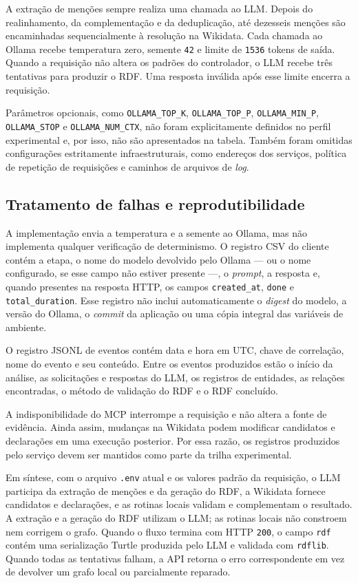 A extração de menções sempre realiza uma chamada ao LLM. Depois do
realinhamento, da complementação e da deduplicação, até dezesseis menções são
encaminhadas sequencialmente à resolução na Wikidata. Cada chamada ao Ollama
recebe temperatura zero, semente \texttt{42} e limite de \texttt{1536} tokens de
saída. Quando a requisição não altera os padrões do controlador, o LLM recebe
três tentativas para produzir o RDF. Uma resposta inválida após esse limite
encerra a requisição.

Parâmetros opcionais, como \texttt{OLLAMA\_TOP\_K},
\texttt{OLLAMA\_TOP\_P}, \texttt{OLLAMA\_MIN\_P}, \texttt{OLLAMA\_STOP} e
\texttt{OLLAMA\_NUM\_CTX}, não foram explicitamente definidos no perfil
experimental e, por isso, não são apresentados na tabela. Também foram omitidas
configurações estritamente infraestruturais, como endereços dos serviços,
política de repetição de requisições e caminhos de arquivos de \textit{log}.

\subsection{Tratamento de falhas e reprodutibilidade}
\label{subsec:hybrid-reprodutibilidade}

A implementação envia a temperatura e a semente ao Ollama, mas não implementa
qualquer verificação de determinismo. O registro CSV do cliente contém a etapa,
o nome do modelo devolvido pelo Ollama --- ou o nome configurado, se esse campo
não estiver presente ---, o \textit{prompt}, a resposta e, quando presentes na
resposta HTTP, os campos \texttt{created\_at}, \texttt{done} e
\texttt{total\_duration}. Esse registro não inclui automaticamente o
\textit{digest} do modelo, a versão do Ollama, o \textit{commit} da aplicação ou
uma cópia integral das variáveis de ambiente.

O registro JSONL de eventos contém data e hora em UTC, chave de correlação, nome
do evento e seu conteúdo. Entre os eventos produzidos estão o início da análise,
as solicitações e respostas do LLM, os registros de entidades, as relações
encontradas, o método de validação do RDF e o RDF concluído.

A indisponibilidade do MCP interrompe a requisição e não altera a fonte de
evidência. Ainda assim, mudanças na Wikidata podem modificar candidatos e
declarações em uma execução posterior. Por essa razão, os registros produzidos
pelo serviço devem ser mantidos como parte da trilha experimental.

Em síntese, com o arquivo \texttt{.env} atual e os valores padrão da requisição,
o LLM participa da extração de menções e da geração do RDF, a Wikidata
fornece candidatos e declarações, e as rotinas locais validam e complementam o
resultado. A extração e a geração do RDF utilizam o LLM; as rotinas locais não
constroem nem corrigem o grafo. Quando o fluxo termina com HTTP \texttt{200}, o
campo \texttt{rdf} contém uma serialização Turtle produzida pelo LLM e validada
com \texttt{rdflib}. Quando todas as tentativas falham, a API retorna o erro
correspondente em vez de devolver um grafo local ou parcialmente reparado.
